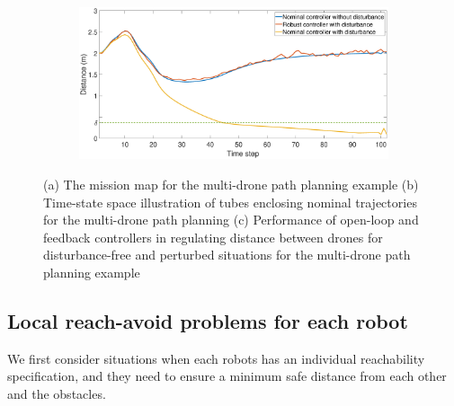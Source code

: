 \begin{figure}[t]
\begin{subfigure}[b]{0.4\textwidth}
         \includegraphics[width=\textwidth]{figures/multi_drone2.eps}
         \caption{}
         \label{fig:multi_drone_distance}
     \end{subfigure}
        \caption{(a) The mission map for the multi-drone path planning example (b) Time-state space illustration of tubes enclosing nominal trajectories for the multi-drone path planning (c) Performance of open-loop and feedback controllers in regulating distance between drones for disturbance-free and perturbed situations for the multi-drone path planning example}
        \label{fig:three figures}
\end{figure}

\subsection{Local reach-avoid problems for each robot}
\label{sec:local reach-avoid}

We first consider situations when each robots has an individual reachability specification, 
and they need to ensure a minimum safe distance from each other and the obstacles.

